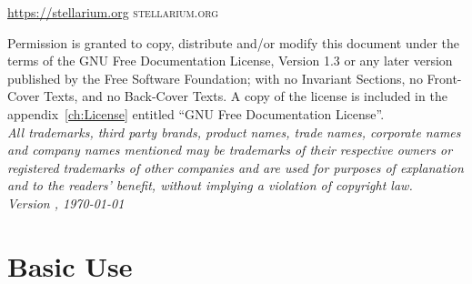 \documentclass[12pt,fleqn,dvipdfmx]{book} %
\newcommand{\DocumentEdition}{1}
\begin{document}
\noindent%
\ifhtlatex
\url{https://stellarium.org}
\else
\textsc{stellarium.org}\\ %
\fi

\noindent Permission is granted to copy, distribute and/or modify 
this document under the terms of the GNU Free Documentation License, 
Version 1.3 or any later version published by the Free Software 
Foundation; with no Invariant Sections, no Front-Cover Texts, 
and no Back-Cover Texts. A copy of the license is included in 
the appendix~\ref{ch:License} entitled ``GNU Free Documentation
License''.\\ %

\small{\noindent \textit{All trademarks, third party brands, product names, trade names,
corporate names and company names mentioned may be trademarks of their
respective owners or registered trademarks of other companies and are
used for purposes of explanation and to the readers' benefit, without
implying a violation of copyright law.}}\\


\noindent \textit{Version \StelVersion-\DocumentEdition, \today} %



\pagestyle{empty} %
\ifpdf
 \tableofcontents %
\fi
\cleardoublepage %




\mainmatter
\pagestyle{fancy} %
\part{Basic Use}

\end{document}
